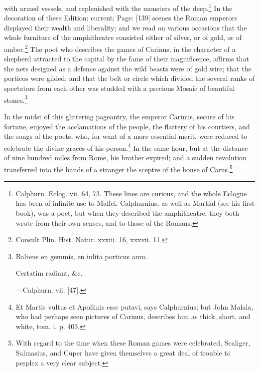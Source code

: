 with armed vessels, and replenished with the monsters of the deep.\footnote{Calphurn. Eclog. vii. 64, 73. These lines are curious, and the whole Eclogue has been of infinite use to Maffei. Calphurnius, as well as Martial (see his first book), was a poet, but when they described the amphitheatre, they both wrote from their own senses, and to those of the Romans.} In the decoration of these Edition: current; Page: [139] scenes the Roman emperors displayed their wealth and liberality; and we read on various occasions that the whole furniture of the amphitheatre consisted either of silver, or of gold, or of amber.\footnote{Consult Plin. Hist. Natur. xxxiii. 16, xxxvii. 11.} The poet who describes the games of Carinus, in the character of a shepherd attracted to the capital by the fame of their magnificence, affirms that the nets designed as a defence against the wild beasts were of gold wire; that the porticos were gilded; and that the belt or circle which divided the several ranks of spectators from each other was studded with a precious Mosaic of beautiful stones.\footnote{Balteus en gemmis, en inlita porticus auro.

Certatim radiant, \&c.

\texthebrew{—}Calphurn. vii. [47].}

In the midst of this glittering pageantry, the emperor Carinus, secure of his fortune, enjoyed the acclamations of the people, the flattery of his courtiers, and the songs of the poets, who, for want of a more essential merit, were reduced to celebrate the divine graces of his person.\footnote{Et Martis vultus et Apollinis esse putavi, says Calphurnius; but John Malala, who had perhaps seen pictures of Carinus, describes him as thick, short, and white, tom. i. p. 403.} In the same hour, but at the distance of nine hundred miles from Rome, his brother expired; and a sudden revolution transferred into the hands of a stranger the sceptre of the house of Carus.\footnote{With regard to the time when these Roman games were celebrated, Scaliger, Salmasius, and Cuper have given themselves a great deal of trouble to perplex a very clear subject.}

